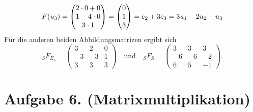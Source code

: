 \documentclass[german,12pt]{homework}
\DeclarePairedDelimiter{\enbrace}{(}{)}
\begin{document}
    \[F\enbrace*{u_3} = \begin{pmatrix}
        2 \cdot 0 + 0\\
        1 - 4 \cdot 0\\
        3 \cdot 1
    \end{pmatrix} = \begin{pmatrix}0\\1\\3\end{pmatrix} = e_2 + 3e_3 = 3u_1 - 2u_2 - u_3\]
    Für die anderen beiden Abbildungsmatrizen ergibt sich
    \[_SF_{E_3} = \begin{pmatrix}
        3 & 2 & 0\\
        -3 & -3 & 1\\
        3 & 3 & 3
    \end{pmatrix} \quad \text{und} \quad _SF_S = \begin{pmatrix}
        3 & 3 & 3\\
        -6 & -6 & -2\\
        6 & 5 & -1
    \end{pmatrix}.\]

    \section*{Aufgabe 6. (Matrixmultiplikation)}
\end{document}
